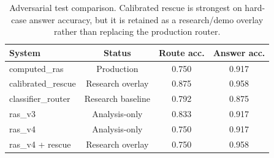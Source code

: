 \begin{table}[t]
\centering
\small
\begin{tabular}{lccc}
\toprule
\textbf{System} & \textbf{Status} & \textbf{Route acc.} & \textbf{Answer acc.} \\
\midrule
computed\_ras & Production & 0.750 & 0.917 \\
calibrated\_rescue & Research overlay & 0.875 & 0.958 \\
classifier\_router & Research baseline & 0.792 & 0.875 \\
ras\_v3 & Analysis-only & 0.833 & 0.917 \\
ras\_v4 & Analysis-only & 0.750 & 0.917 \\
ras\_v4 + rescue & Research overlay & 0.750 & 0.958 \\
\bottomrule
\end{tabular}
\caption{Adversarial test comparison. Calibrated rescue is strongest on hard-case answer accuracy, but it is retained as a research/demo overlay rather than replacing the production router.}
\label{tab:adversarial}
\end{table}
